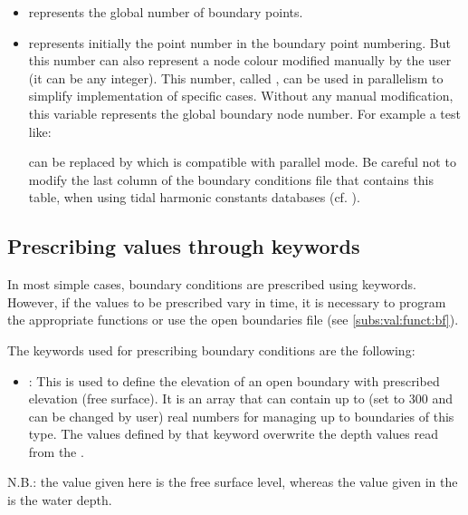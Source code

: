 \begin{itemize}
\item {} represents the global number of boundary points.

\item {} represents initially the point number in the boundary point
numbering.
But this number can also represent a node colour modified manually by the user
(it can be any integer).
This number, called , can be used in parallelism
to simplify implementation of specific cases.
Without any manual modification, this variable represents the global boundary
node number.
For example a test like:

 can be replaced by
which is compatible with parallel mode.
Be careful not to modify the last column of the boundary conditions file
that contains this  table,
when using tidal harmonic constants databases (cf. \cite{Pham2012}).
\end{itemize}

\subsection{Prescribing values through keywords}
\label{subs:val:key}
In most simple cases, boundary conditions are prescribed using keywords.
However, if the values to be prescribed vary in time, it is necessary to program
the appropriate functions or use the open boundaries file
(see \ref{subs:val:funct:bf}).

The keywords used for prescribing boundary conditions are the following:

\begin{itemize}
\item {}:
This is used to define the elevation of an open boundary with prescribed
elevation (free surface).
It is an array that can contain up to 
(set to 300 and can be changed by user) real numbers for managing up to
 boundaries of this type.
The values defined by that keyword overwrite the depth values read
from the .
\end{itemize}

N.B.: the value given here is the free surface level, whereas the value given
in the  is the water depth.

